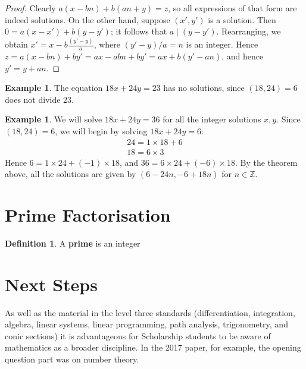 \documentclass[a4paper,leqno]{article}
\numberwithin{equation}{section}
\theoremstyle{definition}
\newtheorem{defn}[equation]{Definition}
\newtheorem{ex}[equation]{Example}
\theoremstyle{remark}
\newcommand{\df}[1]{\textbf{#1}}
\begin{document}
\begin{proof}
  Clearly $ a(x - bn) + b(an + y) = z $, so all expressions of that form are indeed solutions. On the other hand, suppose $ (x', y') $
  is a solution. Then $ 0 = a(x - x') + b(y - y') $; it follows that $ a \mid (y - y') $. Rearranging, we obtain $ x' = x - b\frac{(y' - y)}{a} $,
  where $ (y' - y)/a = n $ is an integer. Hence $ z = a(x - bn) + by' = ax - abn + by' = ax + b(y' - an) $, and hence $ y' = y + an $.
\end{proof}

\begin{ex}
  The equation $ 18x + 24y = 23 $ has no solutions, since $ (18,24) = 6 $ does not divide $ 23 $.
\end{ex}
\begin{ex}
  We will solve $ 18x + 24y = 36 $ for all the integer solutions $ x, y $. Since $ (18,24) = 6 $, we will begin by solving $ 18x + 24y = 6 $:
  \begin{align*}
    24 = 1 \times 18 + 6\\
    18 = 6 \times 3
  \end{align*}
  Hence $ 6 = 1 \times 24 + (-1) \times 18 $, and $ 36 = 6 \times 24 + (-6) \times 18 $. By the theorem above, all the solutions are
  given by $ (6 - 24n, -6 + 18n) $ for $ n \in \mathbb{Z} $.
\end{ex}

\section{Prime Factorisation}
\begin{defn}
  A \df{prime} is an integer
\end{defn}

\section{Next Steps}
As well as the material in the level three standards (differentiation, integration, algebra, linear systems, linear programming, path analysis,
trigonometry, and conic sections) it is advantageous for Scholarship students to be aware of mathematics as a broader discipline. In the 2017
paper, for example, the opening question part was on number theory.
\end{document}
